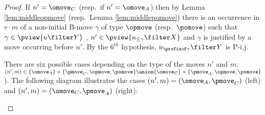 \begin{proof}
If $n' =\omove_C$ (resp.~if $n'=\omove_A$)
then by Lemma \ref{lem:middleopmove}
(resp.~Lemma \ref{lem:middlepomove})
there is an occurrence in $r \cdot m$ of a non-initial B-move $\gamma$ of type $\opmove$
(resp.~$\pomove$) such that $\gamma \in \pview{u\filter Y}$ , $n' \in \pview{u_{\leq \gamma} \filter X}$ and $\gamma$ is justified by a move occurring before $n'$. By the $6^{th}$ hypothesis, $u_{\prefixof \gamma}\filter Y$ is P-i.j.

There are six possible cases depending on
the type of the moves $n'$ and $m$:
$(n',m) \in \{ \omove_A \} \times \{\pmove_C,\opmove,\pomove \}
\union \{ \omove_C \} \times \{\pmove_A,\opmove,\pomove \} $).
The following diagram illustrates the cases $(n',m)
 = (\omove_A,\pmove_C)$ (left)
and  $(n',m)
 = (\omove_C,\pmove_A)$  (right):
\begin{center}
\hspace{2cm}
\end{center}




\end{proof}
